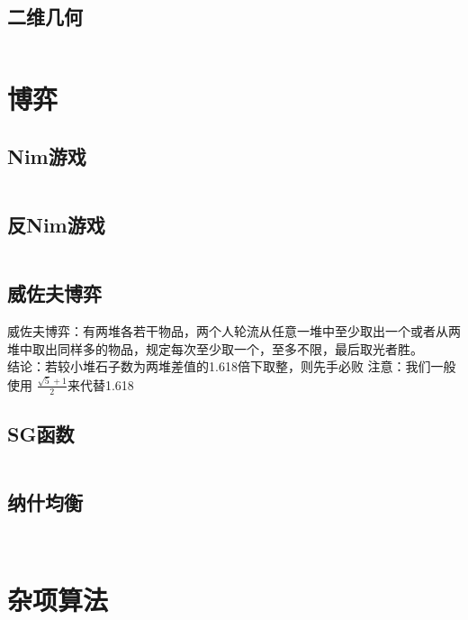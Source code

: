 \documentclass[twocolumn,a4]{article}
\begin{document}
\subsection{二维几何}
\begin{lstlisting}

\end{lstlisting}
\section{博弈}
\subsection{Nim游戏}
\begin{lstlisting}

\end{lstlisting}
\subsection{反Nim游戏}
\begin{lstlisting}

\end{lstlisting}

\subsection{威佐夫博弈}
威佐夫博弈：有两堆各若干物品，两个人轮流从任意一堆中至少取出一个或者从两堆中取出同样多的物品，规定每次至少取一个，至多不限，最后取光者胜。\\
结论：若较小堆石子数为两堆差值的1.618倍下取整，则先手必败
注意：我们一般使用 $\frac{\sqrt{5}+1}{2}$来代替1.618

\subsection{SG函数}
\begin{lstlisting}

\end{lstlisting}

\subsection{纳什均衡}
\begin{lstlisting}
    
\end{lstlisting}
\section{杂项算法}
\end{document}
